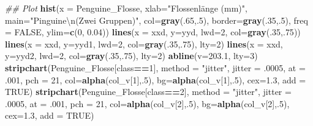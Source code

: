 \documentclass[
  ngerman,
]{book}
\newenvironment{Shaded}{\begin{snugshade}}{\end{snugshade}}
\newcommand{\CharTok}[1]{\textcolor[rgb]{0.31,0.60,0.02}{#1}}
\newcommand{\CommentTok}[1]{\textcolor[rgb]{0.56,0.35,0.01}{\textit{#1}}}
\newcommand{\DataTypeTok}[1]{\textcolor[rgb]{0.13,0.29,0.53}{#1}}
\newcommand{\DecValTok}[1]{\textcolor[rgb]{0.00,0.00,0.81}{#1}}
\newcommand{\FloatTok}[1]{\textcolor[rgb]{0.00,0.00,0.81}{#1}}
\newcommand{\KeywordTok}[1]{\textcolor[rgb]{0.13,0.29,0.53}{\textbf{#1}}}
\newcommand{\NormalTok}[1]{#1}
\newcommand{\OperatorTok}[1]{\textcolor[rgb]{0.81,0.36,0.00}{\textbf{#1}}}
\newcommand{\OtherTok}[1]{\textcolor[rgb]{0.56,0.35,0.01}{#1}}
\newcommand{\StringTok}[1]{\textcolor[rgb]{0.31,0.60,0.02}{#1}}
\begin{document}
\begin{Shaded}
\begin{Highlighting}[]
\CommentTok{## Plot}
\KeywordTok{hist}\NormalTok{(}\DataTypeTok{x =}\NormalTok{ Penguine_Flosse, }\DataTypeTok{xlab=}\StringTok{"Flossenlänge (mm)"}\NormalTok{, }\DataTypeTok{main=}\StringTok{"Pinguine}\CharTok{\textbackslash{}n}\StringTok{(Zwei Gruppen)"}\NormalTok{,}
     \DataTypeTok{col=}\KeywordTok{gray}\NormalTok{(.}\DecValTok{65}\NormalTok{,.}\DecValTok{5}\NormalTok{), }\DataTypeTok{border=}\KeywordTok{gray}\NormalTok{(.}\DecValTok{35}\NormalTok{,.}\DecValTok{5}\NormalTok{), }\DataTypeTok{freq =} \OtherTok{FALSE}\NormalTok{, }\DataTypeTok{ylim=}\KeywordTok{c}\NormalTok{(}\DecValTok{0}\NormalTok{, }\FloatTok{0.04}\NormalTok{))}
\KeywordTok{lines}\NormalTok{(}\DataTypeTok{x =}\NormalTok{ xxd, }\DataTypeTok{y=}\NormalTok{yyd, }\DataTypeTok{lwd=}\DecValTok{2}\NormalTok{, }\DataTypeTok{col=}\KeywordTok{gray}\NormalTok{(.}\DecValTok{35}\NormalTok{,.}\DecValTok{75}\NormalTok{))}
\KeywordTok{lines}\NormalTok{(}\DataTypeTok{x =}\NormalTok{ xxd, }\DataTypeTok{y=}\NormalTok{yyd1, }\DataTypeTok{lwd=}\DecValTok{2}\NormalTok{, }\DataTypeTok{col=}\KeywordTok{gray}\NormalTok{(.}\DecValTok{35}\NormalTok{,.}\DecValTok{75}\NormalTok{), }\DataTypeTok{lty=}\DecValTok{2}\NormalTok{)}
\KeywordTok{lines}\NormalTok{(}\DataTypeTok{x =}\NormalTok{ xxd, }\DataTypeTok{y=}\NormalTok{yyd2, }\DataTypeTok{lwd=}\DecValTok{2}\NormalTok{, }\DataTypeTok{col=}\KeywordTok{gray}\NormalTok{(.}\DecValTok{35}\NormalTok{,.}\DecValTok{75}\NormalTok{), }\DataTypeTok{lty=}\DecValTok{2}\NormalTok{)}
\KeywordTok{abline}\NormalTok{(}\DataTypeTok{v=}\FloatTok{203.1}\NormalTok{, }\DataTypeTok{lty=}\DecValTok{3}\NormalTok{)}
\KeywordTok{stripchart}\NormalTok{(Penguine_Flosse[class}\OperatorTok{==}\DecValTok{1}\NormalTok{], }\DataTypeTok{method =} \StringTok{"jitter"}\NormalTok{, }\DataTypeTok{jitter =} \FloatTok{.0005}\NormalTok{, }\DataTypeTok{at =} \FloatTok{.001}\NormalTok{,}
           \DataTypeTok{pch =} \DecValTok{21}\NormalTok{, }\DataTypeTok{col=}\KeywordTok{alpha}\NormalTok{(col_v[}\DecValTok{1}\NormalTok{],.}\DecValTok{5}\NormalTok{), }\DataTypeTok{bg=}\KeywordTok{alpha}\NormalTok{(col_v[}\DecValTok{1}\NormalTok{],.}\DecValTok{5}\NormalTok{), }\DataTypeTok{cex=}\FloatTok{1.3}\NormalTok{, }\DataTypeTok{add =} \OtherTok{TRUE}\NormalTok{)}
\KeywordTok{stripchart}\NormalTok{(Penguine_Flosse[class}\OperatorTok{==}\DecValTok{2}\NormalTok{], }\DataTypeTok{method =} \StringTok{"jitter"}\NormalTok{, }\DataTypeTok{jitter =} \FloatTok{.0005}\NormalTok{, }\DataTypeTok{at =} \FloatTok{.001}\NormalTok{,}
           \DataTypeTok{pch =} \DecValTok{21}\NormalTok{, }\DataTypeTok{col=}\KeywordTok{alpha}\NormalTok{(col_v[}\DecValTok{2}\NormalTok{],.}\DecValTok{5}\NormalTok{), }\DataTypeTok{bg=}\KeywordTok{alpha}\NormalTok{(col_v[}\DecValTok{2}\NormalTok{],.}\DecValTok{5}\NormalTok{), }\DataTypeTok{cex=}\FloatTok{1.3}\NormalTok{, }\DataTypeTok{add =} \OtherTok{TRUE}\NormalTok{)}
\end{Highlighting}
\end{Shaded}
\end{document}
